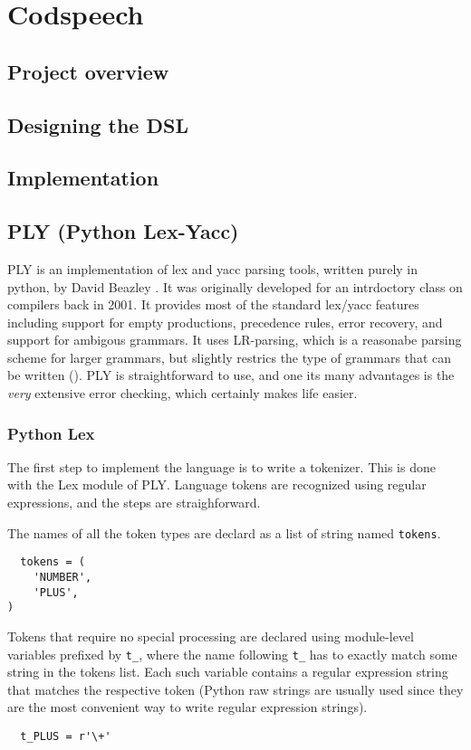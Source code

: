 \chapter{Codspeech}

\section{Project overview}


\section{Designing the DSL}


\section{Implementation}


\section{PLY (Python Lex-Yacc)}
PLY is an implementation of lex and yacc parsing tools, written purely
in python, by David Beazley \citep{ply:online}. It was originally
developed for an intrdoctory class on compilers back in 2001. It
provides most of the standard lex/yacc features including support for
empty productions, precedence rules, error recovery, and support for
ambigous grammars. It uses LR-parsing, which is a reasonabe parsing
scheme for larger grammars, but slightly restrics the type of grammars
that can be written (). PLY is
straightforward to use, and one its many advantages is the \emph{very}
extensive error checking, which certainly makes life easier.

\subsection{Python Lex}
The first step to implement the language is to write a tokenizer. This
is done with the Lex module of PLY. Language tokens are recognized
using regular expressions, and the steps are straighforward.

The names of all the token types are declard as a list of string named
\texttt{tokens}.
\begin{lstlisting}
  tokens = (
    'NUMBER',
    'PLUS',
)
\end{lstlisting}

Tokens that require no special processing are declared using
module-level variables prefixed by \texttt{t_}, where the name
following \texttt{t_} has to exactly match some string in the tokens
list. Each such variable contains a regular expression string that
matches the respective token (Python raw strings are usually used
since they are the most convenient way to write regular expression
strings).
\begin{lstlisting}
  t_PLUS = r'\+'
\end{lstlisting}

